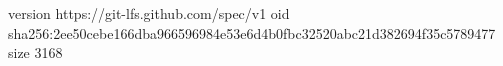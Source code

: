 version https://git-lfs.github.com/spec/v1
oid sha256:2ee50cebe166dba966596984e53e6d4b0fbc32520abc21d382694f35c5789477
size 3168
